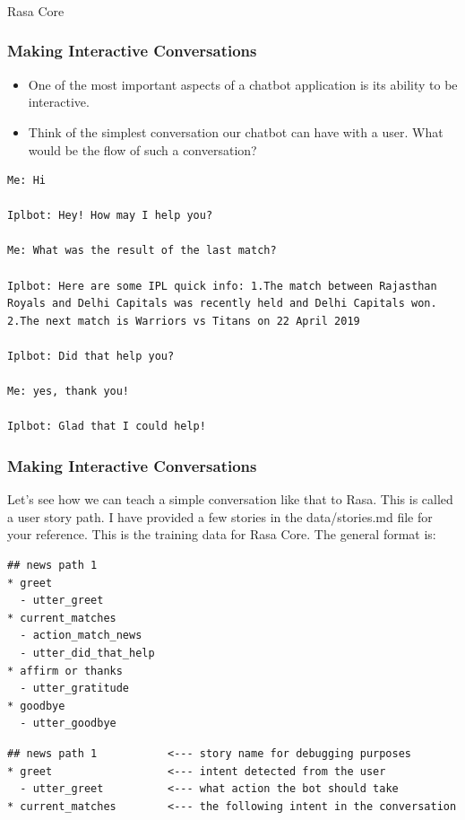  \begin{frame}[fragile]\frametitle{}
 \begin{center}
{\Large Rasa Core}
\end{center}
\end{frame}

 \begin{frame}[fragile]\frametitle{Making Interactive Conversations}

 
\begin{itemize}
\item  One of the most important aspects of a chatbot application is its ability to be interactive.
 
\item Think of the simplest conversation our chatbot can have with a user. What would be the flow of such a conversation?
\end{itemize}
\begin{lstlisting}
Me: Hi

Iplbot: Hey! How may I help you?

Me: What was the result of the last match?

Iplbot: Here are some IPL quick info: 1.The match between Rajasthan Royals and Delhi Capitals was recently held and Delhi Capitals won. 2.The next match is Warriors vs Titans on 22 April 2019

Iplbot: Did that help you?

Me: yes, thank you!

Iplbot: Glad that I could help!
\end{lstlisting}
\end{frame}

 \begin{frame}[fragile]\frametitle{Making Interactive Conversations}

Let's see how we can teach a simple conversation like that to Rasa. This is called a user story path. I have provided a few stories in the data/stories.md file for your reference. This is the training data for Rasa Core. The general format is:

\begin{lstlisting}
## news path 1
* greet
  - utter_greet
* current_matches
  - action_match_news
  - utter_did_that_help
* affirm or thanks
  - utter_gratitude
* goodbye
  - utter_goodbye
\end{lstlisting}

\begin{lstlisting}
## news path 1           <--- story name for debugging purposes
* greet                  <--- intent detected from the user
  - utter_greet          <--- what action the bot should take
* current_matches        <--- the following intent in the conversation
\end{lstlisting}
\end{frame}


